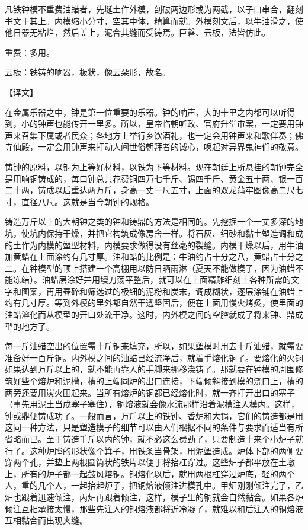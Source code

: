 \documentclass[12pt,UTF8]{ctexbook}
\begin{document}
凡铁钟模不重费油蜡者，先埏土作外模，剖破两边形或为两截，以子口串合，翻刻书文于其上。内模缩小分寸，空其中体，精算而就。外模刻文后，以牛油滑之，使他日器无粘烂，然后盖上，泥合其缝而受铸焉。巨磬、云板，法皆仿此。

重费：多用。

云板：铁铸的响器，板状，像云朵形，故名。

【译文】

在金属乐器之中，钟是第一位重要的乐器。钟的响声，大的十里之内都可以听得到，小的钟声也能传开一里多。所以，皇帝临朝听政、官府升堂审案，一定要用钟声来召集下属或者民众；各地方上举行乡饮酒礼，也一定会用钟声来和歌伴奏；佛寺仙殿，一定会用钟声来打动人间世俗朝拜者的诚心，唤起对异界鬼神们的敬意。

铸钟的原料，以铜为上等好材料，以铁为下等材料。现在朝廷上所悬挂的朝钟完全是用响铜铸成的，每口钟总共花费铜四万七千斤、锡四千斤、黄金五十两、银一百二十两，铸成以后重达两万斤，身高一丈一尺五寸，上面的双龙蒲牢图像高二尺七寸，直径八尺。这就是当今朝钟的规格。

铸造万斤以上的大朝钟之类的钟和铸鼎的方法是相同的。先挖掘一个一丈多深的地坑，使坑内保持干燥，并把它构筑成像房舍一样。将石灰、细砂和黏土塑造调和成的土作为内模的塑型材料，内模要求做得没有丝毫的裂缝。内模干燥以后，用牛油加黄蜡在上面涂约有几寸厚。油和蜡的比例是：牛油约占十分之八，黄蜡占十分之二。在钟模型的顶上搭建一个高棚用以防日晒雨淋（夏天不能做模子，因为油蜡不能冻结）。油蜡层涂好并用墁刀荡平整后，就可以在上面精雕细刻上各种所需的文字和图案，再用舂碎和筛选过的极细的泥粉和炭末，调成糊状，逐层涂铺在油蜡上约有几寸厚。等到外模的里外都自然干透坚固后，便在上面用慢火烤炙，使里面的油蜡溶化而从模型的开口处流干净。这时，内外模之间的空腔就成了将来钟、鼎成型的地方了。

每一斤油蜡空出的位置需十斤铜来填充，所以，如果塑模时用去十斤油蜡，就需要准备好一百斤铜。内外模之间的油蜡已经流净后，就着手熔化铜了。要熔化的火铜如果达到万斤以上的，就不能再靠人的手脚来挪移浇铸了。那就要在钟模的周围修筑好些个熔炉和泥槽，槽的上端同炉的出口连接，下端倾斜接到模的浇口上，槽的两旁还要用炭火围起来。当所有熔炉的铜都已经熔化时，就一齐打开出口的塞子（事先用泥土当成塞子塞住），铜熔液就会像水流那样沿着泥槽注入模内。这样，钟或鼎便铸成功了。一般而言，万斤以上的铁钟、香炉和大锅，它们的铸造都是用这同一种方法，只是塑造模子的细节可以由人们根据不同的条件与要求而适当有所省略而已。至于铸造千斤以内的钟，就不必这么费劲了，只要制造十来个小炉子就行了。这种炉膛的形状像个箕子，用铁条当骨架，用泥塑造成。炉体下部的两侧要穿两个孔，并垫上两根圆筒状的铁片以便于将抬杠穿过。这些炉子都平放在土墩上，所有的炉子都一起鼓风熔铜。铜熔化以后，就用两根杠穿过炉底，轻的两个人，重的几个人，一起抬起炉子，把铜熔液倾注进模孔中。甲炉刚刚倾注完了，乙炉也跟着迅速倾注，丙炉再跟着倾注，这样，模子里的铜就会自然黏合。如果各炉倾注互相承接太慢，那些先注入的铜熔液都将近冷凝了，就难以和后注入的铜熔液互相黏合而出现夹缝。
\end{document}
